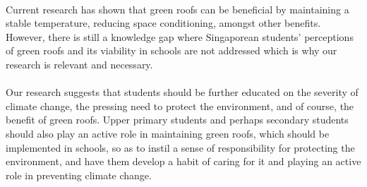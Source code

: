 \documentclass[a4paper]{article}
\begin{document}
\begin{multicols}{2}
  \paragraph{} Current research has shown that green roofs can be
  beneficial by maintaining a stable temperature, reducing space
  conditioning, amongst other benefits. However, there is still
  a knowledge gap where Singaporean students' perceptions of green
  roofs and its viability in schools are not addressed which is why our
  research is relevant and necessary.

  \paragraph{} Our research suggests that students should be further
  educated on the severity of climate change, the pressing need to protect
  the environment, and of course, the benefit of green roofs. Upper
  primary students and perhaps secondary students should also play an
  active role in maintaining green roofs, which should be implemented
  in schools, so as to instil a sense of responsibility for protecting
  the environment, and have them develop a habit of caring for it and
  playing an active role in preventing climate change.


\end{multicols}

\newpage

\printbibliography[heading=bibintoc,title={References}]

\newpage
\end{document}
